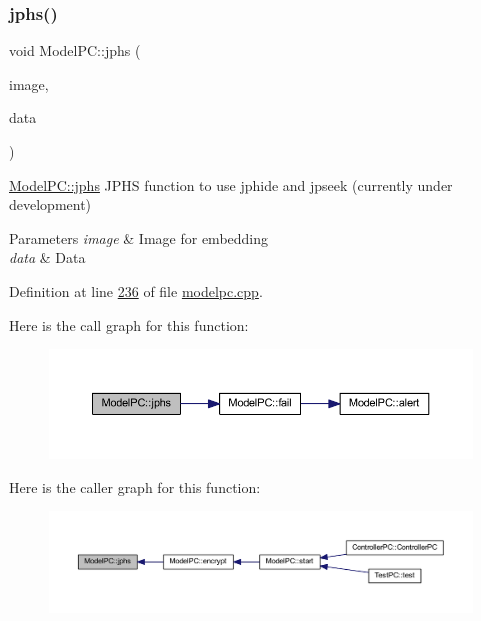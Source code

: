 \subsubsection{\texorpdfstring{jphs()}{jphs()}}
{\footnotesize\ttfamily void Model\+P\+C\+::jphs (\begin{DoxyParamCaption}\item[{Q\+Image $\ast$}]{image,  }\item[{Q\+Byte\+Array $\ast$}]{data }\end{DoxyParamCaption})\hspace{0.3cm}{\ttfamily [protected]}}



\mbox{\hyperlink{class_model_p_c_a8bee0255c09449868c7e6097afaaf0cd}{Model\+P\+C\+::jphs}} J\+P\+HS function to use jphide and jpseek (currently under development) 


\begin{DoxyParams}{Parameters}
{\em image} & Image for embedding \\
\hline
{\em data} & Data \\
\hline
\end{DoxyParams}


Definition at line \mbox{\hyperlink{modelpc_8cpp_source_l00236}{236}} of file \mbox{\hyperlink{modelpc_8cpp_source}{modelpc.\+cpp}}.

Here is the call graph for this function\+:
\nopagebreak
\begin{figure}[H]
\begin{center}
\leavevmode
\includegraphics[width=350pt]{class_model_p_c_a8bee0255c09449868c7e6097afaaf0cd_cgraph}
\end{center}
\end{figure}
Here is the caller graph for this function\+:
\nopagebreak
\begin{figure}[H]
\begin{center}
\leavevmode
\includegraphics[width=350pt]{class_model_p_c_a8bee0255c09449868c7e6097afaaf0cd_icgraph}
\end{center}
\end{figure}
\mbox{\label{class_model_p_c_a1171f9fe1550133dc9053a46b4e5bcfd}} 
